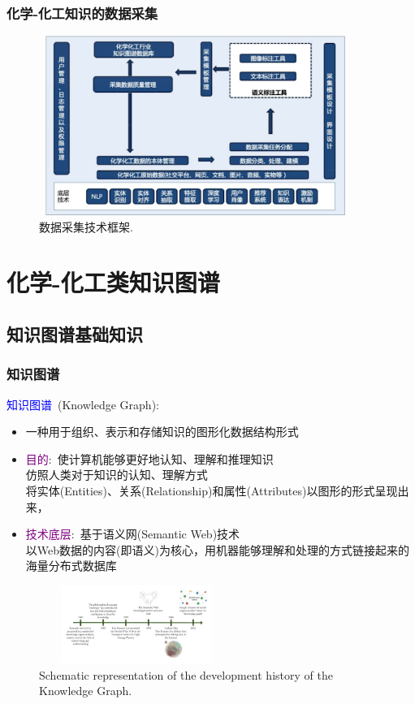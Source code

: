 \begin{frame}
	\frametitle{化学-化工知识的数据采集}
\begin{figure}[h!]
\centering
\includegraphics[height=2.30in,width=4.00in,viewport=0 0 240 150,clip]{Figures/KG_Chem-Tech_Frame.png}
\caption{\tiny 数据采集技术框架.}%
\label{KG_Chem-Tech-Frame}
\end{figure}
\end{frame}

\section{化学-化工类知识图谱}
\subsection{知识图谱基础知识}
\frame
{
	\frametitle{知识图谱}
	\textcolor{blue}{知识图谱}~\textrm{(Knowledge Graph)}:
	\begin{itemize}
		\item 一种用于组织、表示和存储知识的图形化数据结构形式
		\item \textcolor{purple}{目的}:~使计算机能够更好地认知、理解和推理知识\\
			仿照人类对于知识的认知、理解方式\\
			将实体\textrm{(Entities)}、关系\textrm{(Relationship)}和属性\textrm{(Attributes)}以图形的形式呈现出来，
		\item \textcolor{purple}{技术底层}:~基于语义网\textrm{(Semantic Web)}技术\\
			以\textrm{Web}数据的内容(即语义)为核心，用机器能够理解和处理的方式链接起来的海量分布式数据库
	\end{itemize}
\begin{figure}[h!]
\centering
\vskip -8pt
\includegraphics[height=1.00in,width=2.50in,viewport=0 0 160 75,clip]{Figures/Development-history-of-the-knowledge-graph.jpg}
\caption{\tiny\textrm{Schematic representation of the development history of the Knowledge Graph.}}%
\label{Fig:Knowledge-history}
\end{figure}
}


